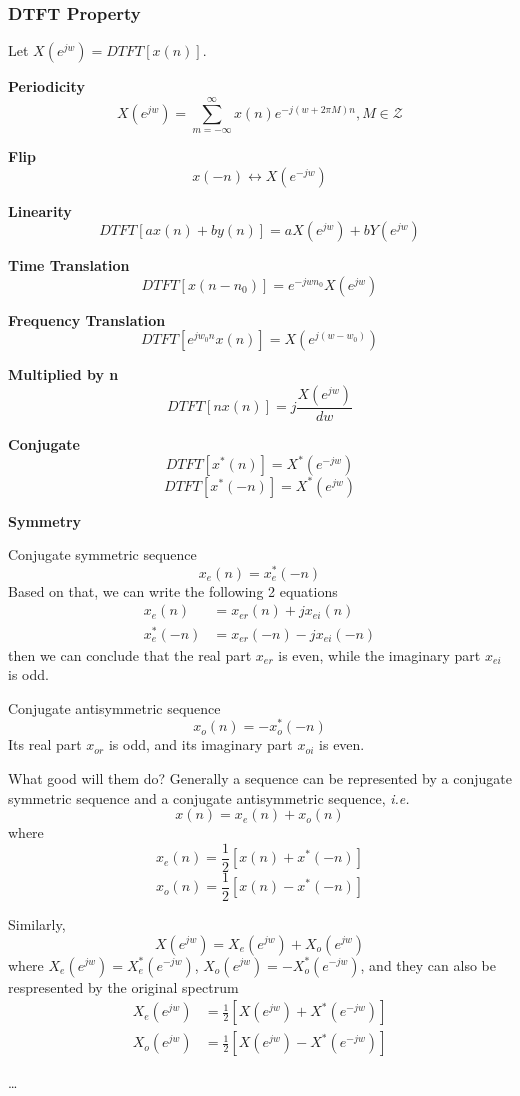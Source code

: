 \subsubsection{DTFT Property}
Let $X(e^{jw}) = DTFT[x(n)]$.

{\bf Periodicity}
\[ X(e^{jw}) = \sum_{m=-\infty}^\infty x(n) e^{-j(w+2\pi M)n} , M \in \mathcal{Z} \]

{\bf Flip}
\[ x(-n) \leftrightarrow X(e^{-jw}) \]

{\bf Linearity}
\[ DTFT[ax(n) + by(n)] = aX(e^{jw}) + bY(e^{jw})\]

{\bf Time Translation}
\[ DTFT[x(n-n_0)] = e^{-jwn_0} X(e^{jw})\]

{\bf Frequency Translation}
\[ DTFT[e^{jw_0n} x(n)] = X(e^{j(w-w_0)})\]

{\bf Multiplied by n}
\[ DTFT[nx(n)] = j\frac{X(e^{jw})}{dw}\]

{\bf Conjugate}
\[ DTFT[x^*(n)] = X^*(e^{-jw}) \]
\[ DTFT[x^*(-n)] = X^*(e^{jw}) \]

{\bf Symmetry}

Conjugate symmetric sequence
\[ x_e(n) = x_e^*(-n)\]
Based on that, we can write the following 2 equations
\begin{align*}
	x_e(n) & = x_{er}(n) + jx_{ei}(n)\\
	x_e^*(-n) & = x_{er}(-n) - jx_{ei}(-n)
\end{align*}
then we can conclude that the real part $x_{er}$ is even, while the imaginary
part $x_{ei}$ is odd.

Conjugate antisymmetric sequence
\[ x_o(n) = - x_o^*(-n)\]
Its real part $x_{or}$ is odd, and its imaginary part $x_{oi}$ is even.

What good will them do? Generally a sequence can be represented by
a conjugate symmetric sequence and a conjugate antisymmetric sequence,
\emph{i.e.}
\[ x(n) = x_e(n) + x_o(n)\]
where
\[ x_e(n) = \frac{1}{2} [x(n) + x^*(-n) ]\]
\[ x_o(n) = \frac{1}{2} [x(n) - x^*(-n) ]\]

Similarly,
\[ X(e^{jw}) = X_e(e^{jw}) + X_o(e^{jw})\]
where $X_e(e^{jw}) = X_e^*(e^{-jw})$, $X_o(e^{jw}) = -X_o^*(e^{-jw})$,
and they can also be respresented by the original spectrum
\begin{align*}
	X_e(e^{jw}) &= \frac{1}{2} [X(e^{jw}) + X^*(e^{-jw})] \\
	X_o(e^{jw}) &= \frac{1}{2} [X(e^{jw}) - X^*(e^{-jw})] 
\end{align*}

\ldots


